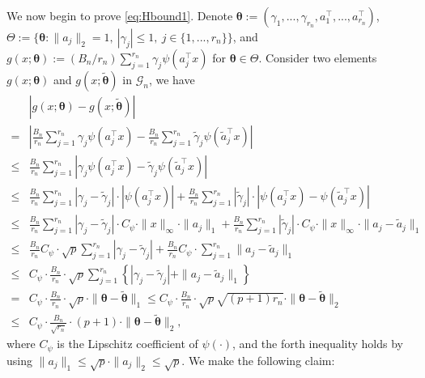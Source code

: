 \documentclass[11pt]{article}
\numberwithin{equation}{section}
\begin{document}
We now begin to prove \eqref{eq:Hbound1}. Denote $\boldsymbol{\theta}:=(\gamma_1,...,\gamma_{r_n},a_1^{\top},...,a_{r_n}^{\top})$, $\Theta:=\{\boldsymbol{\theta}:\|a_j\|_2= 1, \  |\gamma_j|\leq  1, \ j\in\{1,...,r_n\} \}$, and $g(x;\boldsymbol{\theta}):=(B_n/r_n)\sum_{j=1}^{r_n} \gamma_j\psi(a_j^\top x)$ for $\boldsymbol{\theta}\in\Theta$. Consider two elements $g(x;\boldsymbol{\theta})$ and $g(x;\widetilde{\boldsymbol{\theta}})$ in $\mathcal{G}_{n}$, we have
\begin{align*}
	&|g(x;\boldsymbol{\theta})-g(x;\widetilde{\boldsymbol{\theta}})|\\
	=&	\left|\frac{B_n}{r_n}\sum_{j=1}^{r_n} \gamma_j\psi(a_j^\top x)-\frac{B_n}{r_n}\sum_{j=1}^{r_n} \widetilde{\gamma}_j\psi(\widetilde{a}_j^\top x)\right|\\
	\leq & \frac{B_n}{r_n}\sum_{j=1}^{r_n}\left|\gamma_j\psi(a_j^\top x)-\widetilde{\gamma}_j\psi(\widetilde{a}_j^\top x)\right|\\
	\leq&   \frac{B_n}{r_n}\sum_{j=1}^{r_n}\left|\gamma_j-\widetilde{\gamma}_j\right|\cdot |\psi(a_j^\top x)|+ \frac{B_n}{r_n}\sum_{j=1}^{r_n}|\widetilde{\gamma}_j|\cdot\left|\psi(a_j^\top x)-\psi(\widetilde{a}_j^\top x)\right|\\
	\leq &  \frac{B_n}{r_n}\sum_{j=1}^{r_n}\left|\gamma_j-\widetilde{\gamma}_j\right|\cdot C_{\psi}\cdot \|x\|_{\infty}\cdot \|a_j\|_{1}+\frac{B_n}{r_n}\sum_{j=1}^{r_n}|\widetilde{\gamma}_j|\cdot C_{\psi}\cdot \|x\|_{\infty} \cdot \|a_j-\widetilde{a}_j\|_1\\
	\leq & \frac{B_n}{r_n} C_{\psi}\cdot \sqrt{p} \sum_{j=1}^{r_n}\left|\gamma_j-\widetilde{\gamma}_j\right| +\frac{B_n}{r_n}C_{\psi}\cdot \sum_{j=1}^{r_n}   \|a_j-\widetilde{a}_j\|_1\\
	\leq& C_{\psi}\cdot \frac{B_n}{r_n}\cdot \sqrt{p}\sum_{j=1}^{r_n}   \left\{\left|\gamma_j-\widetilde{\gamma}_j\right|+\|a_j-\widetilde{a}_j\|_1\right\}\\
	= &C_{\psi}\cdot \frac{B_n}{r_n}\cdot \sqrt{p}\cdot \|\boldsymbol{\theta}-\tilde{\boldsymbol{\theta}}\|_1\leq C_{\psi}\cdot \frac{B_n}{r_n}\cdot \sqrt{p} \sqrt{(p+1)r_n}\cdot \|\boldsymbol{\theta}-\tilde{\boldsymbol{\theta}}\|_2\\
	\leq& C_{\psi}\cdot \frac{B_n}{\sqrt{r_n}}\cdot (p+1) \cdot \|\boldsymbol{\theta}-\tilde{\boldsymbol{\theta}}\|_2,
\end{align*}
where $C_{\psi}$ is the Lipschitz coefficient of $\psi(\cdot)$, and the forth inequality holds by using $\|a_j\|_1\leq \sqrt{p}\cdot \|a_j\|_2\leq \sqrt{p}$.  We make the following claim:
\end{document}
